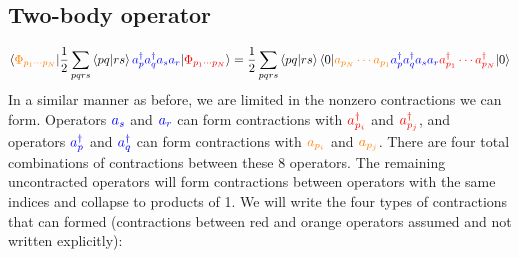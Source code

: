 \documentclass{article}
\newcommand{\dg}{\ensuremath{^\dagger} }
\newcommand{\cd}{\ensuremath{\cdots} }
\begin{document}
\subsection{Two-body operator }
\[\braket{{\color{orange} \Phi_{p_1 \cd p_N} } |  \frac{1}{2}  \sum_{pqrs} \braket{pq | rs} {\color{blue}  a_p\dg a_q\dg a_s a_r } | {\color{red} \Phi_{p_1 \cd p_N}}} = 
 \frac{1}{2}  \sum_{pqrs} \braket{pq | rs} \braket{ 0| {\color{orange} a_{p_N} \cd a_{p_1} } {\color{blue} a_p\dg a_q\dg a_s a_r} {\color{red} a_{p_1}\dg \cd a_{p_N}\dg }| 0} \]
In a similar manner as before, we are limited in the nonzero contractions we can form. 
Operators  ${\color{blue}  a_s}$ and ${\color{blue}  a_r}$ can form contractions with ${\color{red} a_{p_i}\dg } $ and ${\color{red} a_{p_j}\dg}$,
and operators $ {\color{blue}  a_p\dg}$ and ${\color{blue}  a_q\dg}$ can form contractions with  $ {\color{orange} a_{p_i} }$ and ${\color{orange} a_{p_j}}$.
There are four total combinations of contractions between these 8 operators.
The remaining uncontracted operators will form contractions between operators with the same indices and collapse to products of 1. 
We will write the four types of contractions that can formed (contractions between red and orange operators assumed and not written explicitly): 
\end{document}
